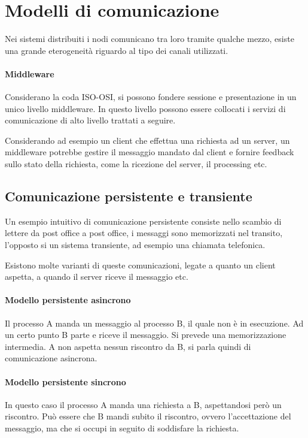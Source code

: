 \section{Modelli di comunicazione}
Nei sistemi distribuiti i nodi comunicano tra loro tramite qualche
mezzo, esiste una grande eterogeneità riguardo al tipo dei canali utilizzati.

\paragraph{Middleware}
Considerano la coda ISO-OSI, si possono fondere sessione e presentazione 
in un unico livello middleware. In questo livello possono essere collocati i 
servizi di comunicazione di alto livello trattati a seguire.

Considerando ad esempio un client che effettua una richiesta ad un 
server, un middleware potrebbe gestire il messaggio mandato 
dal client e fornire feedback sullo stato della richiesta, 
come la ricezione del server, il processing etc.

\subsection{Comunicazione persistente e transiente}
Un esempio intuitivo di comunicazione persistente consiste nello scambio 
di lettere da post office a post office, i messaggi sono 
memorizzati nel transito, l'opposto si un sistema transiente,
ad esempio una chiamata 
telefonica.

Esistono molte varianti di queste comunicazioni, legate a quanto 
un client aspetta, a quando il server riceve il messaggio etc.

\paragraph{Modello persistente asincrono}
Il processo A manda un messaggio al processo B, il quale non è in esecuzione.
Ad un certo punto B parte e riceve il messaggio. Si prevede una memorizzazione 
intermedia. A non aspetta nessun riscontro da B, si parla quindi di comunicazione 
asincrona.

\paragraph{Modello persistente sincrono}
In questo caso il processo A manda una richiesta a B, aspettandosi però 
un riscontro.
Può essere che B mandi subito il riscontro, ovvero l'accettazione del messaggio, 
ma che si occupi in seguito di soddisfare la richiesta.

